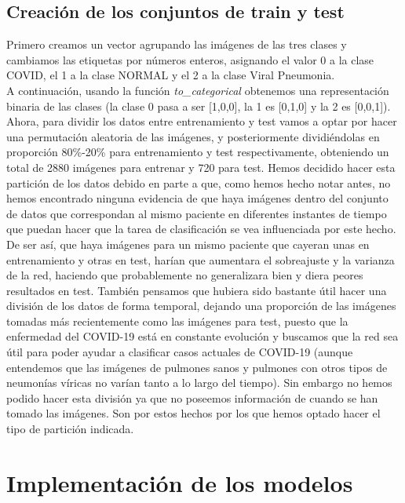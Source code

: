\documentclass[11pt,a4paper]{article}
\theoremstyle{definition}
\begin{document}
\subsection{Creación de los conjuntos de train y test}

Primero creamos un vector agrupando las imágenes de las tres clases y cambiamos las etiquetas por números enteros, asignando el valor 0 a la clase COVID, el 1 a la clase NORMAL y el 2 a la clase Viral Pneumonia.\\

A continuación, usando la función \textit{to\_categorical} obtenemos una representación binaria de las clases (la clase 0 pasa a ser [1,0,0], la 1 es [0,1,0] y la 2 es [0,0,1]).\\

Ahora, para dividir los datos entre entrenamiento y test vamos a optar por hacer una permutación aleatoria de las imágenes, y posteriormente dividiéndolas en proporción 80\%-20\% para entrenamiento y test respectivamente, obteniendo un total de 2880 imágenes para entrenar y 720 para test. Hemos decidido hacer esta partición de los datos debido en parte a que, como hemos hecho notar antes, no hemos encontrado ninguna evidencia de que haya imágenes dentro del conjunto de datos que correspondan al mismo paciente en diferentes instantes de tiempo que puedan hacer que la tarea de clasificación se vea influenciada por este hecho. De ser así, que haya imágenes para un mismo paciente que cayeran unas en entrenamiento y otras en test, harían que aumentara el sobreajuste y la varianza de la red, haciendo que probablemente no generalizara bien y diera peores resultados en test. También pensamos que hubiera sido bastante útil hacer una división de los datos de forma temporal, dejando una proporción de las imágenes tomadas más recientemente como las imágenes para test, puesto que la enfermedad del COVID-19 está en constante evolución y buscamos que la red sea útil para poder ayudar a clasificar casos actuales de COVID-19 (aunque entendemos que las imágenes de pulmones sanos y pulmones con otros tipos de neumonías víricas no varían tanto a lo largo del tiempo). Sin embargo no hemos podido hacer esta división ya que no poseemos información de cuando se han tomado las imágenes. Son por estos hechos por los que hemos optado hacer el tipo de partición indicada.

\section{Implementación de los modelos}
\end{document}
